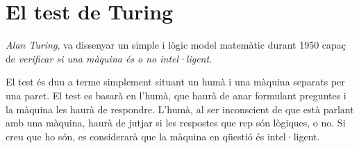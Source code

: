 \section{El test de Turing}

\emph{Alan Turing}, va dissenyar un simple i lògic model matemàtic durant 1950 capaç de \emph{verificar si una màquina és o no intel·ligent}.

El test és duu a terme simplement situant un humà i una màquina separats per una paret. El test es basarà en l'humà, que haurà de anar formulant preguntes i la màquina les haurà de respondre. L'humà, al ser inconscient de que està parlant amb una màquina, haurà de jutjar si les respostes que rep són lògiques, o no. Si creu que ho són, es considerarà que la màquina en qüestió és intel·ligent. \cite{MaTur}
